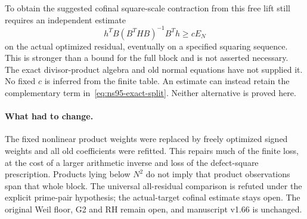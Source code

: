 To obtain the suggested cofinal square-scale contraction from this
free lift still requires an independent estimate
\[
 h^TB(B^THB)^{-1}B^Th\ge c E_N
\]
on the actual optimized residual, eventually on a specified squaring
sequence. This is stronger than a bound for the full block and is not
asserted necessary. The exact divisor-product algebra and old normal
equations have not supplied it. No fixed $c$ is inferred from the
finite table. An estimate can instead retain the complementary term
in~\eqref{eq:ns95-exact-split}. Neither alternative is proved here.

\paragraph{What had to change.}
The fixed nonlinear product weights were replaced by freely optimized
signed weights and all old coefficients were refitted. This repairs
much of the finite loss, at the cost of a larger arithmetic inverse and
loss of the defect-square prescription. Products lying below $N^2$
do not imply that product observations span that whole block. The
universal all-residual comparison is refuted under the explicit prime-pair
hypothesis; the actual-target cofinal estimate stays open. The original
Weil floor, G2 and RH remain open, and manuscript v1.66 is unchanged.
